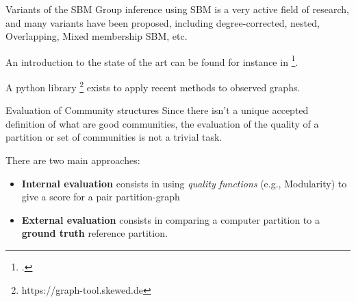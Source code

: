 \begin{textbox}{Variants of the SBM}
Group inference using SBM is a very active field of research, and many variants have been proposed, including degree-corrected, nested, Overlapping, Mixed membership SBM, etc.

An introduction to the state of the art can be found for instance in \footcite{lee2019review}.

A python library \footnote{https://graph-tool.skewed.de} exists to apply recent methods to observed graphs.
\end{textbox}



\begin{textbox}{Evaluation of Community structures}
Since there isn't a unique accepted definition of what are good communities, the evaluation of the quality of a partition or set of communities is not a trivial task. 

There are two main approaches:
\begin{itemize}
    \item \textbf{Internal evaluation} consists in using \textit{quality functions} (e.g., Modularity) to give a score for a pair partition-graph
    \item \textbf{External evaluation} consists in comparing a computer partition to a \textbf{ground truth} reference partition.
\end{itemize}
\end{textbox}

